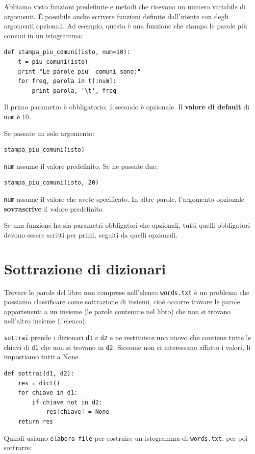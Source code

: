 \documentclass[10pt]{book}
\begin{document}
Abbiamo visto funzioni predefinite e metodi che ricevono un numero variabile di argomenti. È possibile anche scrivere funzioni definite dall'utente con degli argomenti opzionali. Ad esempio, questa è una funzione che stampa le parole più comuni in un istogramma:

\begin{verbatim}
def stampa_piu_comuni(isto, num=10):
    t = piu_comuni(isto)
    print "Le parole piu' comuni sono:"
    for freq, parola in t[:num]:
        print parola, '\t', freq
\end{verbatim}

Il primo parametro è obbligatorio; il secondo è opzionale. Il {\bf valore di default} di {\tt num} è 10.

Se passate un solo argomento:

\begin{verbatim}
stampa_piu_comuni(isto)
\end{verbatim}

{\tt num} assume il valore predefinito. Se ne passate due:

\begin{verbatim}
stampa_piu_comuni(isto, 20)
\end{verbatim}

{\tt num} assume il valore che avete specificato. In altre parole, l'argomento opzionale {\bf sovrascrive} il valore predefinito.

Se una funzione ha sia parametri obbligatori che opzionali, tutti quelli obbligatori devono essere scritti per primi, seguiti da quelli opzionali.


\section{Sottrazione di dizionari}

Trovare le parole del libro non comprese nell'elenco {\tt words.txt} è un problema che possiamo classificare come sottrazione di insiemi, cioè occorre trovare le parole appartenenti a un insieme (le parole contenute nel libro) che non si trovano nell'altro insieme (l'elenco).

{\tt sottrai} prende i dizionari {\tt d1} e {\tt d2} e ne restituisce uno nuovo che contiene tutte le chiavi di {\tt d1} che non si trovano in {\tt d2}.  Siccome non ci interessano affatto i valori, li impostiamo tutti a None.

\begin{verbatim}
def sottrai(d1, d2):
    res = dict()
    for chiave in d1:
        if chiave not in d2:
            res[chiave] = None
    return res
\end{verbatim}
%
Quindi usiamo \verb"elabora_file" per costruire un istogramma di
{\tt words.txt}, per poi sottrarre:
\end{document}

